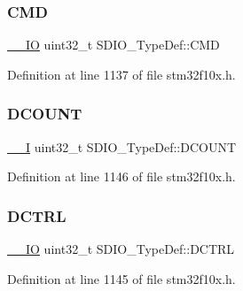 \subsubsection{\texorpdfstring{C\+MD}{CMD}}
{\footnotesize\ttfamily \hyperlink{core__sc300_8h_aec43007d9998a0a0e01faede4133d6be}{\+\_\+\+\_\+\+IO} uint32\+\_\+t S\+D\+I\+O\+\_\+\+Type\+Def\+::\+C\+MD}



Definition at line 1137 of file stm32f10x.\+h.

\mbox{\label{struct_s_d_i_o___type_def_a0366564e2795952d520c0de4be70020f}} 
\subsubsection{\texorpdfstring{D\+C\+O\+U\+NT}{DCOUNT}}
{\footnotesize\ttfamily \hyperlink{core__sc300_8h_af63697ed9952cc71e1225efe205f6cd3}{\+\_\+\+\_\+I} uint32\+\_\+t S\+D\+I\+O\+\_\+\+Type\+Def\+::\+D\+C\+O\+U\+NT}



Definition at line 1146 of file stm32f10x.\+h.

\mbox{\label{struct_s_d_i_o___type_def_a801519a7af801ad43b88007bf4e2e906}} 
\subsubsection{\texorpdfstring{D\+C\+T\+RL}{DCTRL}}
{\footnotesize\ttfamily \hyperlink{core__sc300_8h_aec43007d9998a0a0e01faede4133d6be}{\+\_\+\+\_\+\+IO} uint32\+\_\+t S\+D\+I\+O\+\_\+\+Type\+Def\+::\+D\+C\+T\+RL}



Definition at line 1145 of file stm32f10x.\+h.

\mbox{\label{struct_s_d_i_o___type_def_aa98ab507ed05468ca4baccd1731231cd}} 
